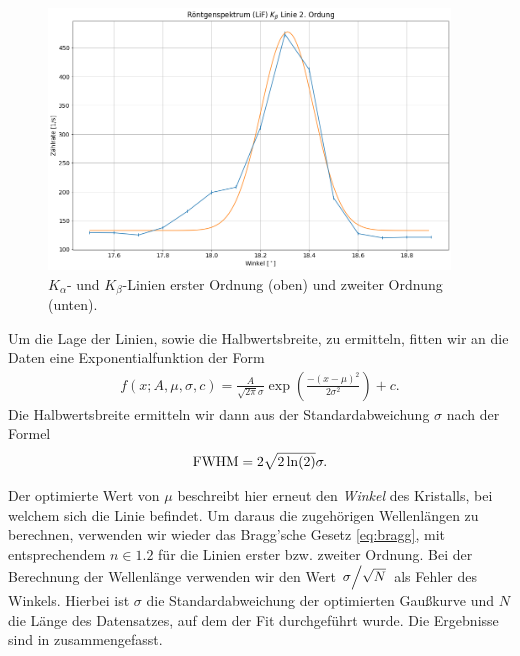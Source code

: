 \begin{figure}[H]
\begin{minipage}{0.5\textwidth}
\end{minipage}\hfill
\begin{minipage}{0.5\textwidth}
    \centering
    \includegraphics[width=0.95\textwidth]{files/plots/lif_kbeta_2ord.png}
\end{minipage}
\caption{$K_{\alpha}$- und $K_{\beta}$-Linien erster Ordnung (oben) und zweiter Ordnung (unten).}
\label{fig:lif_kalpha_kbeta}
\end{figure}

Um die Lage der Linien, sowie die Halbwertsbreite, zu ermitteln, fitten wir an die Daten eine Exponentialfunktion der Form
\begin{align}
  f(x;A,\mu,\sigma,c) = \frac{A}{\sqrt{2 \pi}\sigma} \exp(\frac{-(x - \mu)^2}{2 \sigma^2}) + c.
\end{align}
Die Halbwertsbreite ermitteln wir dann aus der Standardabweichung $\sigma$ nach der Formel
\begin{align}
  \mathrm{FWHM} = 2\sqrt{2\ln(2)}\sigma.
\end{align}

Der optimierte Wert von $\mu$ beschreibt hier erneut den \textit{Winkel} des Kristalls, bei welchem sich die Linie befindet. Um daraus die zugehörigen Wellenlängen zu berechnen, verwenden wir wieder das Bragg'sche Gesetz \eqref{eq:bragg}, mit entsprechendem $n \in \qty{1,2}$ für die Linien erster bzw. zweiter Ordnung. Bei der Berechnung der Wellenlänge verwenden wir den Wert $\flatfrac{\sigma}{\sqrt{N}}$ als Fehler des Winkels. Hierbei ist $\sigma$ die Standardabweichung der optimierten Gaußkurve und $N$ die Länge des Datensatzes, auf dem der Fit durchgeführt wurde. Die Ergebnisse sind in  zusammengefasst.

